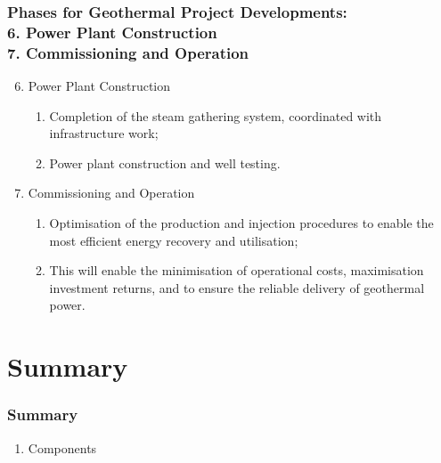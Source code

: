 \documentclass[10pt,compress]{beamer}
\begin{document}
\begin{frame}
 \frametitle{Phases for Geothermal Project Developments: \\ 6. Power Plant Construction \\ 7. Commissioning and Operation }
    \begin{enumerate}[1]\setcounter{enumi}{5}
       \item <1-> Power Plant Construction
         \begin{enumerate}[{6.}1]
           \item<1-> Completion of the steam gathering system, coordinated with infrastructure work;
           \item<1-> Power plant construction and well testing.
         \end{enumerate}
       \item <2-> Commissioning and Operation
         \begin{enumerate}[{7.}1]
           \item<2-> Optimisation of the production and injection procedures to enable the most efficient energy recovery and utilisation;
           \item<2-> This will enable the minimisation of operational costs, maximisation investment returns, and to ensure the reliable delivery of geothermal power.
         \end{enumerate}
    \end{enumerate}
\end{frame}
 


























\section{Summary}
\begin{frame}
 \frametitle{Summary}
  \begin{enumerate}
%
     \item <1-> Components 
%
  \end{enumerate}
\end{frame}
\end{document}
